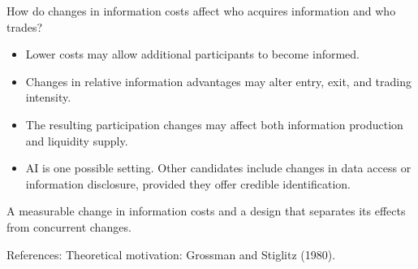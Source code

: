 \begin{frame}[t]
\par{}
\begin{pmbody}
{\color{pmGrey}\fontsize{20}{27}\selectfont How do changes in information costs affect who acquires information and who trades?\par}
\begin{itemize}\pmspreaditems
  \item Lower costs may allow additional participants to become informed.
  \item Changes in relative information advantages may alter entry, exit, and trading intensity.
  \item The resulting participation changes may affect both information production and liquidity supply.
  \item AI is one possible setting. Other candidates include changes in data access or information disclosure, provided they offer credible identification.
\end{itemize}
\begin{pmcallout}
  A measurable change in information costs and a design that separates its effects from concurrent changes.
\end{pmcallout}
{\color{pmGrey}\fontsize{11}{14}\selectfont References: Theoretical motivation: Grossman and Stiglitz (1980).\par}
\end{pmbody}
\end{frame}

